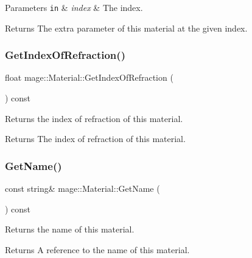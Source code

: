 \begin{DoxyParams}[1]{Parameters}
\mbox{\tt in}  & {\em index} & The index. \\
\hline
\end{DoxyParams}
\begin{DoxyReturn}{Returns}
The extra parameter of this material at the given index. 
\end{DoxyReturn}
\hypertarget{structmage_1_1_material_afa719020dabd412bbb06ac9f0d85abe9}{}\label{structmage_1_1_material_afa719020dabd412bbb06ac9f0d85abe9} 
\subsubsection{\texorpdfstring{Get\+Index\+Of\+Refraction()}{GetIndexOfRefraction()}}
{\footnotesize\ttfamily float mage\+::\+Material\+::\+Get\+Index\+Of\+Refraction (\begin{DoxyParamCaption}{ }\end{DoxyParamCaption}) const\hspace{0.3cm}{\ttfamily [noexcept]}}

Returns the index of refraction of this material.

\begin{DoxyReturn}{Returns}
The index of refraction of this material. 
\end{DoxyReturn}
\hypertarget{structmage_1_1_material_a9edb2f437eca07c6c12c24d10ec30eb3}{}\label{structmage_1_1_material_a9edb2f437eca07c6c12c24d10ec30eb3} 
\subsubsection{\texorpdfstring{Get\+Name()}{GetName()}}
{\footnotesize\ttfamily const string\& mage\+::\+Material\+::\+Get\+Name (\begin{DoxyParamCaption}{ }\end{DoxyParamCaption}) const\hspace{0.3cm}{\ttfamily [noexcept]}}

Returns the name of this material.

\begin{DoxyReturn}{Returns}
A reference to the name of this material. 
\end{DoxyReturn}
\hypertarget{structmage_1_1_material_a0be98911c56dedaa4fd2f8714fc8a793}{}\label{structmage_1_1_material_a0be98911c56dedaa4fd2f8714fc8a793} 
